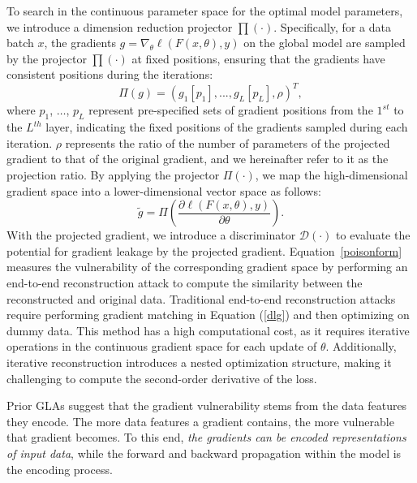 To search in the continuous parameter space for the optimal model parameters, 
we introduce a dimension reduction projector $\prod(\cdot)$. 
Specifically, for a data batch $x$, the gradients $g=\nabla_\theta\ell(F(x,\theta),y)$ on the global model are sampled by the projector $\prod(\cdot)$ at fixed positions, ensuring that the gradients have consistent positions during the iterations:
\begin{equation}
    \Pi(g)=(g_{1}[p_1],...,g_{L}[p_L], \rho)^T,
\end{equation}
where $p_1$, $\ldots$, $p_L$ represent pre-specified sets of gradient positions from the $1^{st}$ to the $L^{th}$ layer, indicating the fixed positions of the gradients sampled during each iteration. $\rho$ represents the ratio of the number of parameters of the projected gradient to that of the original gradient, and we hereinafter refer to it as the projection ratio. By applying the projector $\Pi(\cdot)$, we map the high-dimensional gradient space into a lower-dimensional vector space as follows:
\begin{equation}
    \tilde{g}=\Pi\left(\frac{\partial \ell(F(x,\theta),y)}{\partial\theta}\right).
\end{equation}
With the projected gradient, we introduce a discriminator $\mathcal{D}(\cdot)$ to evaluate the potential for gradient leakage by the projected gradient. 
Equation~\eqref{poisonform} measures the vulnerability of the corresponding gradient space by performing an end-to-end reconstruction attack to compute the similarity between the reconstructed and original data. 
Traditional end-to-end reconstruction attacks require performing gradient matching in Equation (\ref{dlg}) and then optimizing on dummy data. This method has a high computational cost, as it requires iterative operations in the continuous gradient space for each update of $\theta$. Additionally, iterative reconstruction introduces a nested optimization structure, making it challenging to compute the second-order derivative of the loss.

Prior GLAs suggest that the gradient vulnerability stems from the data features they encode. The more data features a gradient contains, the more vulnerable that gradient becomes. To this end, \textit{the gradients can be encoded representations of input data}, while the forward and backward propagation within the model is the encoding process.

